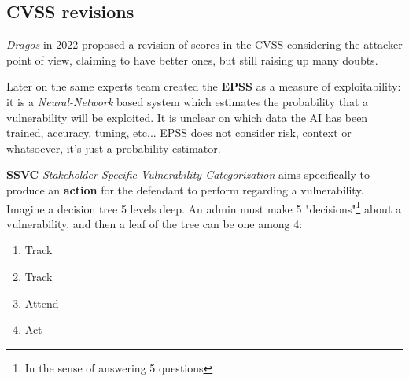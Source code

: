 \subsection{CVSS revisions}
\textit{Dragos} in 2022 proposed a revision of scores in the CVSS considering the attacker point of view, claiming to have better ones,
but still raising up many doubts.

Later on the same experts team created the \textbf{EPSS} as a measure of exploitability:
it is a \textit{Neural-Network} based system which estimates the probability that a vulnerability will be exploited.
It is unclear on which data the AI has been trained, accuracy, tuning, etc...
EPSS does not consider risk, context or whatsoever, it's just a probability estimator.

\textbf{SSVC} \textit{Stakeholder-Specific Vulnerability Categorization} aims specifically to produce an \textbf{action} for the defendant to perform regarding a vulnerability. 
Imagine a decision tree 5 levels deep. An admin must make 5 "decisions"\footnote{In the sense of answering 5 questions} about a vulnerability, and then a leaf of the tree can be one among 4:
\begin{enumerate}
    \item {\color{green}Track}
    \item {\color{yellow}Track}
    \item {\color{orange}Attend}
    \item {\color{red}Act}
\end{enumerate}

